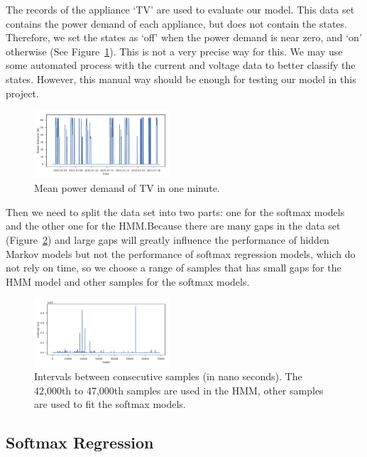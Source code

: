 \documentclass[sigconf]{acmart}
\begin{document}
The records of the appliance `TV' are used to evaluate our model. This
data set contains the power demand of each appliance, but does not
contain the states. Therefore, we set the states as `off' when the
power demand is near zero, and `on' otherwise (See
Figure~\ref{fig:tv-power}). This is not a very precise way for this.
We may use some automated process with the current and voltage data to
better classify the states. However, this manual way should be enough
for testing our model in this project.

\begin{figure}[ht]
  \centering
  \includegraphics[width=0.45\textwidth]{figures/tv_power}
  \caption{\label{fig:tv-power} Mean power demand of TV in one minute.}
\end{figure}


Then we need to split the data set into two parts: one for the softmax
models and the other one for the HMM.\@ Because there are many gaps in
the data set (Figure~\ref{fig:gaps}) and large gaps will greatly
influence the performance of hidden Markov models but not the
performance of softmax regression models, which do not rely on time,
so we choose a range of samples that has small gaps for the HMM
model and other samples for the softmax models.

\begin{figure}[ht]
  \centering
  \includegraphics[width=0.45\textwidth]{figures/gaps}
  \caption{\label{fig:gaps} Intervals between consecutive samples (in
    nano seconds). The 42,000th to 47,000th samples are used in the HMM,
    other samples are used to fit the softmax models.}
\end{figure}

\subsection{Softmax Regression}
\end{document}
